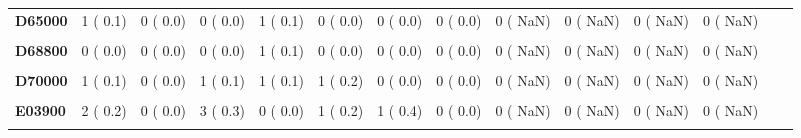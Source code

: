 \documentclass[
]{article}
\begin{document}
\begin{table}[H]
\begin{tabular}[t]{>{\raggedright\arraybackslash}p{5em}ccccccccccccc}
\textbf{D65000} & 1 (  0.1) & 0 (  0.0) & 0 (  0.0) & 1 (  0.1) & 0 (  0.0) & 0 (  0.0) & 0 (  0.0) & 0 (  NaN) & 0 (  NaN) & 0 (  NaN) & 0 (  NaN) &  & \\
\textbf{\cellcolor{gray!10}{D68600}} & \cellcolor{gray!10}{1 (  0.1)} & \cellcolor{gray!10}{0 (  0.0)} & \cellcolor{gray!10}{0 (  0.0)} & \cellcolor{gray!10}{0 (  0.0)} & \cellcolor{gray!10}{0 (  0.0)} & \cellcolor{gray!10}{0 (  0.0)} & \cellcolor{gray!10}{0 (  0.0)} & \cellcolor{gray!10}{0 (  NaN)} & \cellcolor{gray!10}{0 (  NaN)} & \cellcolor{gray!10}{0 (  NaN)} & \cellcolor{gray!10}{0 (  NaN)} & \cellcolor{gray!10}{} & \cellcolor{gray!10}{}\\
\textbf{D68800} & 0 (  0.0) & 0 (  0.0) & 0 (  0.0) & 1 (  0.1) & 0 (  0.0) & 0 (  0.0) & 0 (  0.0) & 0 (  NaN) & 0 (  NaN) & 0 (  NaN) & 0 (  NaN) &  & \\
\textbf{\cellcolor{gray!10}{D69600}} & \cellcolor{gray!10}{0 (  0.0)} & \cellcolor{gray!10}{0 (  0.0)} & \cellcolor{gray!10}{2 (  0.2)} & \cellcolor{gray!10}{2 (  0.3)} & \cellcolor{gray!10}{0 (  0.0)} & \cellcolor{gray!10}{0 (  0.0)} & \cellcolor{gray!10}{0 (  0.0)} & \cellcolor{gray!10}{0 (  NaN)} & \cellcolor{gray!10}{0 (  NaN)} & \cellcolor{gray!10}{0 (  NaN)} & \cellcolor{gray!10}{0 (  NaN)} & \cellcolor{gray!10}{} & \cellcolor{gray!10}{}\\
\textbf{D70000} & 1 (  0.1) & 0 (  0.0) & 1 (  0.1) & 1 (  0.1) & 1 (  0.2) & 0 (  0.0) & 0 (  0.0) & 0 (  NaN) & 0 (  NaN) & 0 (  NaN) & 0 (  NaN) &  & \\
\textbf{\cellcolor{gray!10}{D72800}} & \cellcolor{gray!10}{0 (  0.0)} & \cellcolor{gray!10}{0 (  0.0)} & \cellcolor{gray!10}{1 (  0.1)} & \cellcolor{gray!10}{0 (  0.0)} & \cellcolor{gray!10}{0 (  0.0)} & \cellcolor{gray!10}{0 (  0.0)} & \cellcolor{gray!10}{0 (  0.0)} & \cellcolor{gray!10}{0 (  NaN)} & \cellcolor{gray!10}{0 (  NaN)} & \cellcolor{gray!10}{0 (  NaN)} & \cellcolor{gray!10}{0 (  NaN)} & \cellcolor{gray!10}{} & \cellcolor{gray!10}{}\\
\textbf{E03900} & 2 (  0.2) & 0 (  0.0) & 3 (  0.3) & 0 (  0.0) & 1 (  0.2) & 1 (  0.4) & 0 (  0.0) & 0 (  NaN) & 0 (  NaN) & 0 (  NaN) & 0 (  NaN) &  & \\
\textbf{\cellcolor{gray!10}{E05500}} & \cellcolor{gray!10}{0 (  0.0)} & \cellcolor{gray!10}{0 (  0.0)} & \cellcolor{gray!10}{0 (  0.0)} & \cellcolor{gray!10}{0 (  0.0)} & \cellcolor{gray!10}{0 (  0.0)} & \cellcolor{gray!10}{1 (  0.4)} & \cellcolor{gray!10}{0 (  0.0)} & \cellcolor{gray!10}{0 (  NaN)} & \cellcolor{gray!10}{0 (  NaN)} & \cellcolor{gray!10}{0 (  NaN)} & \cellcolor{gray!10}{0 (  NaN)} & \cellcolor{gray!10}{} & \cellcolor{gray!10}{}\\

\end{tabular}
\end{table}
\end{document}
